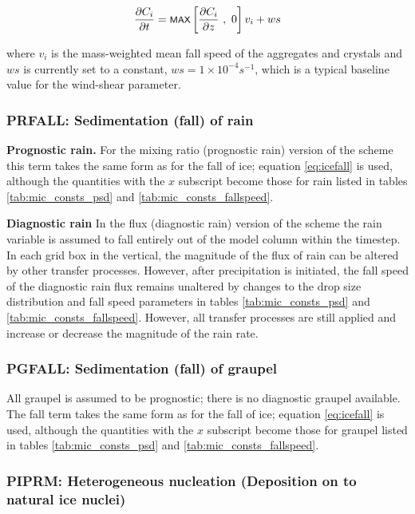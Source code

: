 \documentclass{UMDP_article}
\newcommand{\mmax}[1] {\mbox{\footnotesize \sf MAX} \left[#1\right]  }
\def\bq{\begin{equation}}
\def\eq{\end{equation}}
\begin{document}
\bq
\frac{\partial{C_i}}{\partial t} = \mmax{ 
\frac{\partial{C_i}}{\partial z}~,~0} v_i + ws
\eq

where $v_i$ is the mass-weighted mean fall speed of the aggregates and crystals
and $ws$ is currently set to a constant, $ws=1 \times 10^{-4} s^{-1}$, which is
a typical baseline value for the wind-shear parameter. 

\subsubsection{PRFALL: Sedimentation (fall) of rain}
\label{sec:PRFALL}

\textbf{Prognostic rain.}
For the mixing ratio (prognostic rain) version of the scheme this term 
takes the same form as for the fall of ice; equation \ref{eq:icefall} is used, 
although the quantities with the $x$ subscript become those for rain listed in
tables \ref{tab:mic_consts_psd} and \ref{tab:mic_consts_fallspeed}.

\textbf{Diagnostic rain}
In the flux (diagnostic rain) version of the scheme the rain variable is 
assumed to fall entirely out of the model column within the timestep. In each
grid box in the vertical, the magnitude of the flux of rain can be altered by
other transfer processes. However, after precipitation is initiated, the 
fall speed of the diagnostic rain flux remains unaltered by changes to the 
drop size distribution and fall speed parameters in tables 
\ref{tab:mic_consts_psd} and \ref{tab:mic_consts_fallspeed}. However, all 
transfer processes are still applied and increase or decrease the magnitude
of the rain rate.

\subsubsection{PGFALL: Sedimentation (fall) of graupel}

All graupel is assumed to be prognostic; there
is no diagnostic graupel available. The fall term takes the same form as for 
the fall of ice; equation \ref{eq:icefall} is used, 
although the quantities with the $x$ subscript become those for graupel listed in
tables \ref{tab:mic_consts_psd} and \ref{tab:mic_consts_fallspeed}.

\subsubsection{PIPRM: Heterogeneous nucleation (Deposition on to natural ice nuclei)}
\end{document}
